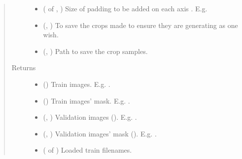 \documentclass[letterpaper,10pt,english]{sphinxmanual}
\begin{document}
\begin{fulllineitems}
\begin{quote}
\begin{description}
\begin{itemize}
\item {} 
 ( of , ) \textendash{} Size of padding to be added on each axis . E.g. 

\item {} 
 (, ) \textendash{} To save the crops made to ensure they are generating as one wish.

\item {} 
 (, ) \textendash{} Path to save the crop samples.

\end{itemize}

\item[{Returns}] \leavevmode
\begin{itemize}
\item {} 
 () \textendash{} Train images. E.g. .

\item {} 
 () \textendash{} Train images’ mask. E.g. .

\item {} 
 (, ) \textendash{} Validation images (). E.g. .

\item {} 
 (, ) \textendash{} Validation images’ mask (). E.g. .

\item {} 
 ( of ) \textendash{} Loaded train filenames.

\end{itemize}



\end{description}
\end{quote}
\end{fulllineitems}
\end{document}
